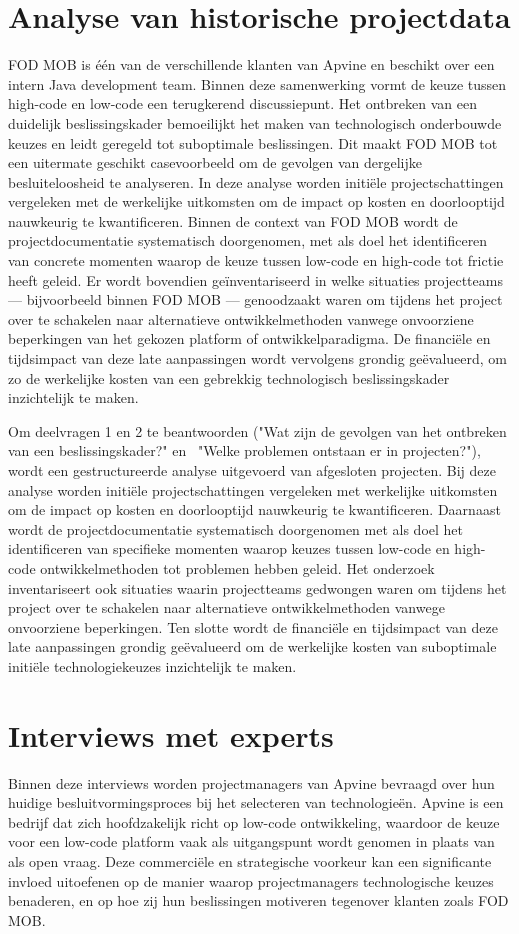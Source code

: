 \section{Analyse van historische projectdata}
\gls{FOD MOB} is één van de verschillende klanten van Apvine en beschikt over een intern Java development team. Binnen deze samenwerking vormt de keuze tussen high-code en low-code een terugkerend discussiepunt. Het ontbreken van een duidelijk beslissingskader bemoeilijkt het maken van technologisch onderbouwde keuzes en leidt geregeld tot suboptimale beslissingen. Dit maakt \gls{FOD MOB} tot een uitermate geschikt casevoorbeeld om de gevolgen van dergelijke besluiteloosheid te analyseren.
In deze analyse worden initiële projectschattingen vergeleken met de werkelijke uitkomsten om de impact op kosten en doorlooptijd nauwkeurig te kwantificeren. Binnen de context van \gls{FOD MOB} wordt de projectdocumentatie systematisch doorgenomen, met als doel het identificeren van concrete momenten waarop de keuze tussen low-code en high-code tot frictie heeft geleid. Er wordt bovendien geïnventariseerd in welke situaties projectteams — bijvoorbeeld binnen \gls{FOD MOB} — genoodzaakt waren om tijdens het project over te schakelen naar alternatieve ontwikkelmethoden vanwege onvoorziene beperkingen van het gekozen platform of ontwikkelparadigma. De financiële en tijdsimpact van deze late aanpassingen wordt vervolgens grondig geëvalueerd, om zo de werkelijke kosten van een gebrekkig technologisch beslissingskader inzichtelijk te maken.


Om deelvragen 1 en 2 te beantwoorden ("Wat zijn de gevolgen van het ontbreken van een beslissingskader?" \; \hbox{en} \, "Welke problemen ontstaan er in projecten?"), wordt een gestructureerde analyse uitgevoerd van afgesloten projecten. Bij deze analyse worden initiële projectschattingen vergeleken met werkelijke uitkomsten om de impact op kosten en doorlooptijd nauwkeurig te kwantificeren. Daarnaast wordt de projectdocumentatie systematisch doorgenomen met als doel het identificeren van specifieke momenten waarop keuzes tussen low-code en high-code ontwikkelmethoden tot problemen hebben geleid. Het onderzoek inventariseert ook situaties waarin projectteams gedwongen waren om tijdens het project over te schakelen naar alternatieve ontwikkelmethoden vanwege onvoorziene beperkingen. Ten slotte wordt de financiële en tijdsimpact van deze late aanpassingen grondig geëvalueerd om de werkelijke kosten van suboptimale initiële technologiekeuzes inzichtelijk te maken.
\section{Interviews met experts}
Binnen deze interviews worden projectmanagers van Apvine bevraagd over hun huidige besluitvormingsproces bij het selecteren van technologieën. Apvine is een bedrijf dat zich hoofdzakelijk richt op low-code ontwikkeling, waardoor de keuze voor een low-code platform vaak als uitgangspunt wordt genomen in plaats van als open vraag. Deze commerciële en strategische voorkeur kan een significante invloed uitoefenen op de manier waarop projectmanagers technologische keuzes benaderen, en op hoe zij hun beslissingen motiveren tegenover klanten zoals \gls{FOD MOB}.

